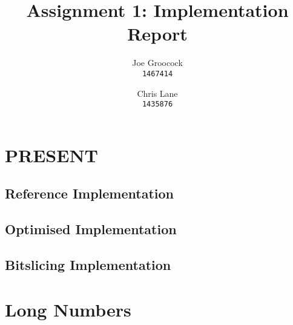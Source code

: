\documentclass[11pt, a4paper]{article}
\title{Assignment 1: Implementation Report}
\author{Joe Groocock    \\ \texttt{\normalsize 1467414}
    \and Chris Lane     \\ \texttt{\normalsize 1435876}
}
\begin{document}
\maketitle

\section{PRESENT}\label{sec:present}
\subsection{Reference Implementation}\label{subsec:referenceImplementation}

\subsection{Optimised Implementation}\label{subsec:optimisedImplementation}





\subsection{Bitslicing Implementation}\label{subsec:bitslicingImplementation}





\section{Long Numbers}\label{sec:longnumbers}
\end{document}
